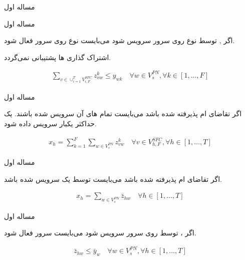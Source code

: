 \documentclass{beamer}
\begin{document}
\begin{persian}
\begin{frame}{مساله اول}
\end{frame}
\begin{frame}{مساله اول}
    \par
    اگر , 
    توسط  نوع 
    روی سرور  سرویس شود می‌بایست
     نوع 
    روی سرور  فعال شود.
    \par
    اشتراک گذاری ها پشتیبانی نمی‌گردد.
    \begin{latin}\begin{align}
    \sum_{v \in \cup_{i=1}^T V_{i, F}^{SFC}} z_{vw}^k \le y_{wk}
    \quad
    \forall w \in V_s^{PN}, \forall k \in [1,\ldots, F]
    \end{align}\end{latin}
\end{frame}
\begin{frame}{مساله اول}
    \par
    اگر تقاضای ام پذیرفته شده باشد
    می‌بایست تمام های آن‌
    سرویس شده باشند.
    یک  حداکثر یکبار سرویس داده شود.
    \begin{latin}\begin{align}
        x_h = \sum_{k=1}^{F} \sum_{w \in V_{s}^{PN}} z_{vw}^{k}
        \quad
        \forall v \in V_{h,F}^{SFC}, \forall h \in [1,\ldots, T]
    \end{align}\end{latin}
\end{frame}
\begin{frame}{مساله اول}
    \par
    اگر تقاضای ام پذیرفته شده باشد
    می‌بایست توسط یک  سرویس شده باشد.
    \begin{latin}\begin{align}
        x_h = \sum_{w \in V_{s}^{PN}} \bar{z}_{hw}
        \quad
        \forall h \in [1,\ldots, T]
    \end{align}\end{latin}
\end{frame}
\begin{frame}{مساله اول}
    \par
    اگر ، 
    توسط  روی سرور 
    سرویس شود می‌بایست  سرور 
    فعال شود.
    \begin{latin}\begin{align}
        \bar{z}_{hw} \le \bar{y}_w
        \quad
        \forall w \in V_{s}^{PN}, \forall h \in [1,\ldots, T]
    \end{align}\end{latin}

\end{frame}
\end{persian}
\end{document}
